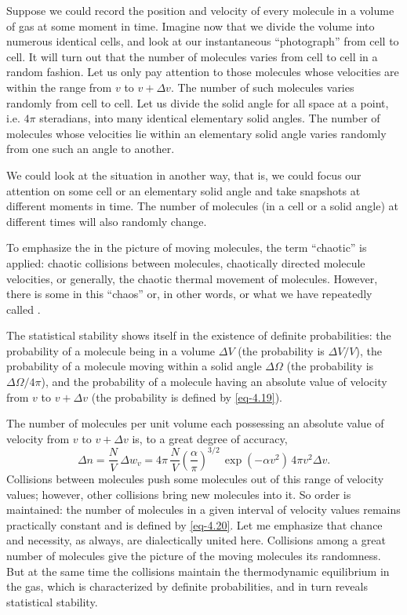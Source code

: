  Suppose we could record the position and velocity of every molecule in a volume of gas at some moment in time. Imagine now that we divide the volume into numerous identical cells, and look at our instantaneous ``photograph'' from cell to cell. It will turn out that the number of molecules varies from cell to cell in a random fashion. Let us only pay attention to those molecules whose velocities are within the range from $v$ to $v + \Delta v$. The number of such molecules varies randomly from cell to cell. Let us divide the solid angle for all space at a point, i.e. $4 \pi$ steradians, into many identical elementary solid angles. The number of molecules whose velocities lie within an elementary solid angle varies randomly from one such an angle to another.

We could look at the situation in another way, that is, we could focus our attention on some cell or an elementary solid angle and take snapshots at different moments in time. The number of molecules (in a cell or a solid angle) at different times will also randomly change.

To emphasize the  in the picture of moving molecules, the term ``chaotic'' is applied: chaotic collisions between molecules, chaotically directed molecule velocities, or generally, the chaotic thermal
movement of molecules. However, there is some  in this ``chaos'' or, in other words,  or what we have repeatedly called .

The statistical stability shows itself in the existence of definite probabilities: the probability of a molecule being in a volume $\Delta V$ (the probability is $\Delta V/ V$), the probability of a molecule moving within a solid angle $\Delta \Omega$ (the probability is $\Delta \Omega/4\pi$), and the probability of a molecule having an absolute value of velocity from $v$ to $v + \Delta v$ (the probability is defined by \eqref{eq-4.19}).

The number of molecules per unit volume each possessing an absolute value of velocity from $v$ to $v + \Delta v$ is, to a great degree of accuracy,
\begin{equation}%
\Delta n = \frac{N}{V} \, \Delta w_{v}  =  4 \pi \, \frac{N}{V}  \left(\frac{\alpha}{\pi} \right) ^{3/2} \, \exp (- \alpha v^{2}) \, 4 \pi v^{2} \Delta v.
\label{eq-4.20}
\end{equation}
Collisions between molecules push some molecules out of this range of velocity values; however, other collisions bring new molecules into it. So order is maintained: the number of molecules in a given interval of velocity values remains practically constant and is defined by \eqref{eq-4.20}. Let me emphasize that chance and necessity, as always, are dialectically united here. Collisions among a great number of molecules give the picture of the moving molecules its randomness. But at the same time the collisions maintain the thermodynamic equilibrium in the gas, which is characterized by definite probabilities, and in turn reveals statistical stability.

